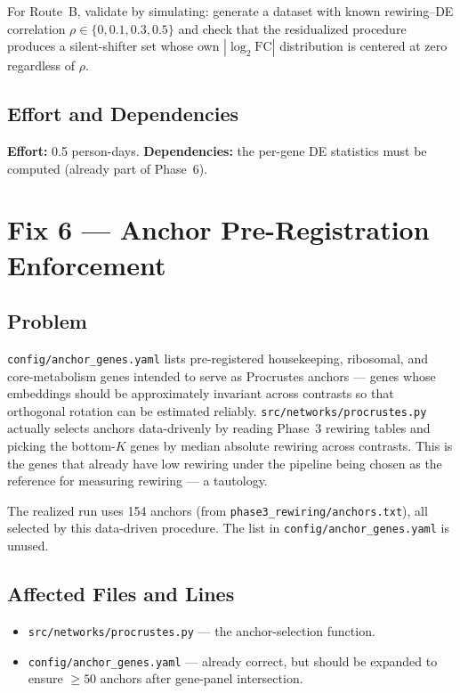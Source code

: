 \documentclass[11pt]{article}
\newcommand{\code}[1]{\texttt{#1}}
\begin{document}
For Route~B, validate by simulating: generate a dataset with known rewiring--DE correlation $\rho\in\{0, 0.1, 0.3, 0.5\}$ and check that the residualized procedure produces a silent-shifter set whose own $|\log_2 \mathrm{FC}|$ distribution is centered at zero regardless of $\rho$.

\subsection{Effort and Dependencies}

\textbf{Effort:} 0.5 person-days. \textbf{Dependencies:} the per-gene DE statistics must be computed (already part of Phase~6).

\section{Fix 6 --- Anchor Pre-Registration Enforcement}

\subsection{Problem}

\code{config/anchor\_genes.yaml} lists pre-registered housekeeping, ribosomal, and core-metabolism genes intended to serve as Procrustes anchors --- genes whose embeddings should be approximately invariant across contrasts so that orthogonal rotation can be estimated reliably. \code{src/networks/procrustes.py} actually selects anchors data-drivenly by reading Phase~3 rewiring tables and picking the bottom-$K$ genes by median absolute rewiring across contrasts. This is the genes that already have low rewiring under the pipeline being chosen as the reference for measuring rewiring --- a tautology.

The realized run uses 154 anchors (from \code{phase3\_rewiring/anchors.txt}), all selected by this data-driven procedure. The list in \code{config/anchor\_genes.yaml} is unused.

\subsection{Affected Files and Lines}

\begin{itemize}[leftmargin=*]
\item \code{src/networks/procrustes.py} --- the anchor-selection function.
\item \code{config/anchor\_genes.yaml} --- already correct, but should be expanded to ensure $\geq 50$ anchors after gene-panel intersection.
\end{itemize}
\end{document}
